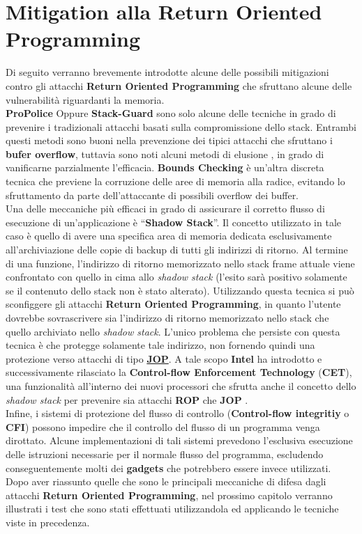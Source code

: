 \section{Mitigation alla Return Oriented Programming}
\label{sec:mitigation}
Di seguito verranno brevemente introdotte alcune delle possibili mitigazioni contro gli attacchi \textbf{Return Oriented Programming} che sfruttano alcune delle vulnerabilità riguardanti la memoria.\\
\textbf{ProPolice} \cite*{Pro-Police} Oppure \textbf{Stack-Guard} \cite*{Stackguard} sono solo alcune delle tecniche in grado di prevenire i tradizionali attacchi basati sulla compromissione dello stack. Entrambi questi metodi sono buoni nella prevenzione dei tipici attacchi che sfruttano i \textbf{bufer overflow}, tuttavia sono noti alcuni metodi di elusione \cite*{StackGuard-bypass}, in grado di vanificarne parzialmente l'efficacia. \textbf{Bounds Checking} \cite*{BoundsChecking} è un'altra discreta tecnica che previene la corruzione 
delle aree di memoria alla radice, evitando lo sfruttamento da parte dell'attaccante di possibili overflow dei buffer.\\
Una delle meccaniche più efficaci in grado di assicurare il corretto flusso di esecuzione di un'applicazione è ``\textbf{Shadow Stack}''. Il concetto utilizzato in tale caso è quello di avere una specifica area di memoria dedicata esclusivamente all'archiviazione delle copie di backup di tutti gli indirizzi di ritorno. Al termine di una funzione, l'indirizzo di ritorno memorizzato nello stack frame attuale viene confrontato con quello in cima allo \textit{shadow stack} (l'esito sarà positivo solamente se il contenuto dello stack
non è stato alterato). Utilizzando questa tecnica si può sconfiggere gli attacchi \textbf{Return Oriented Programming}, in quanto l'utente dovrebbe sovrascrivere sia l'indirizzo di ritorno memorizzato nello stack che quello archiviato nello \textit{shadow stack}. L'unico problema che persiste con questa tecnica è che protegge solamente tale indirizzo, non fornendo quindi una protezione verso attacchi di tipo \hyperref[jop]{\textbf{JOP}}. A tale scopo \textbf{Intel} ha introdotto e successivamente rilasciato la 
\textbf{Control-flow Enforcement Technology} (\textbf{CET}), una funzionalità all'interno dei nuovi processori che sfrutta anche il concetto dello \textit{shadow stack} per prevenire sia attacchi \textbf{ROP} che \textbf{JOP} \cite{CET}.\\
Infine, i sistemi di protezione del flusso di controllo (\textbf{Control-flow integritiy} o \textbf{CFI}) \cite*{CFI1}\cite*{CFI2} possono impedire che il controllo del flusso di un programma venga dirottato. Alcune implementazioni di tali sistemi prevedono l'esclusiva esecuzione delle istruzioni necessarie per il normale flusso del programma, escludendo conseguentemente molti dei \textbf{gadgets} che potrebbero essere invece utilizzati.\\
Dopo aver riassunto quelle che sono le principali meccaniche di difesa dagli attacchi \textbf{Return Oriented Programming}, nel prossimo capitolo verranno illustrati i test che sono stati effettuati utilizzandola ed applicando le tecniche viste in precedenza.
